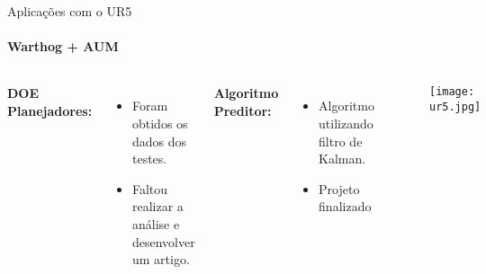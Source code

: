 \begin{frame}[t]{Aplicações com o UR5} 
    \framesubtitle{Warthog + AUM}
        \begin{columns}[t]

            \textbf{DOE Planejadores:}
            \begin{itemize}
                \item Foram obtidos os dados dos testes.
                \item Faltou realizar a análise e desenvolver um artigo.
            \end{itemize}
            \textbf{Algoritmo Preditor:}
            \begin{itemize}
                \item Algoritmo utilizando filtro de Kalman.
                \item Projeto finalizado
            \end{itemize}
            \begin{center}
                \begin{figure}
                    \texttt{[image: ur5.jpg]}
                \end{figure}
            \end{center}
        \end{columns}
\end{frame}
